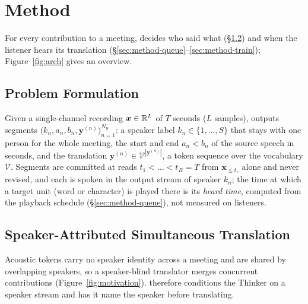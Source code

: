 \section{Method}
\label{sec:method}



For every contribution to a meeting, \sys{} decides who said what (\S\ref{sec:method-thinker}) and when the listener
hears its translation (\S\ref{sec:method-queue}--\ref{sec:method-train}); Figure~\ref{fig:arch} gives an overview.

\subsection{Problem Formulation}
\label{sec:method-task}

Given a single-channel recording $\bm{x}\in\mathbb{R}^{L}$ of $T$ seconds ($L$ samples), \sys{} outputs segments
$\big(k_n,a_n,b_n,\bm{y}^{(n)}\big)_{n=1}^{N_\mathcal{Y}}$: a speaker label $k_n\in\{1,\dots,S\}$ that stays with one
person for the whole meeting, the start and end $a_n<b_n$ of the source speech in seconds, and the translation
$\bm{y}^{(n)}\in\mathcal{V}^{|\bm{y}^{(n)}|}$, a token sequence over the vocabulary $\mathcal{V}$. Segments are committed
at reads $t_1<\dots<t_R=T$ from $\bm{x}_{\le t_r}$ alone and never revised, and each is spoken in the output stream of
speaker $k_n$; the time at which a target unit (word or character) is played there is its \emph{heard time}, computed
from the playback schedule (\S\ref{sec:method-queue}), not measured on listeners.

\subsection{Speaker-Attributed Simultaneous Translation}
\label{sec:method-thinker}

Acoustic tokens carry no speaker identity across a meeting and are shared by overlapping speakers, so a speaker-blind
translator merges concurrent contributions (Figure~\ref{fig:motivation}). \sys{} therefore conditions the Thinker on a
speaker stream and has it name the speaker before translating.

